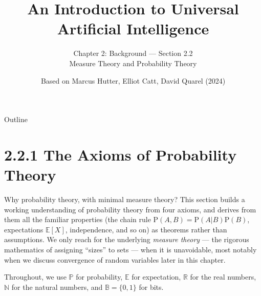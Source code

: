 \documentclass[aspectratio=169,10pt]{beamer}
\title[UAI -- Ch.2.2]{An Introduction to Universal Artificial Intelligence}
\subtitle{Chapter 2: Background --- Section 2.2 \\ Measure Theory and Probability Theory}
\author{Based on Marcus Hutter, Elliot Catt, David Quarel (2024)}
\date{}
\begin{document}
\begin{frame}
\titlepage
\end{frame}

\begin{frame}{Outline}
\tableofcontents
\end{frame}

\section{2.2.1 The Axioms of Probability Theory}

\begin{frame}{Why probability theory, with minimal measure theory?}
This section builds a working understanding of probability theory from four
axioms, and derives from them all the familiar properties (the chain rule
$\mathrm{P}(A,B)=\mathrm{P}(A|B)\mathrm{P}(B)$, expectations $\mathbb{E}[X]$,
independence, and so on) as theorems rather than assumptions. We only reach
for the underlying \emph{measure theory} --- the rigorous mathematics of
assigning ``sizes'' to sets --- when it is unavoidable, most notably when we
discuss convergence of random variables later in this chapter.

\vspace{2mm}
Throughout, we use $\mathbb{P}$ for probability, $\mathbb{E}$ for
expectation, $\mathbb{R}$ for the real numbers, $\mathbb{N}$ for the natural
numbers, and $\mathbb{B}=\{0,1\}$ for bits.
\end{frame}
\end{document}
